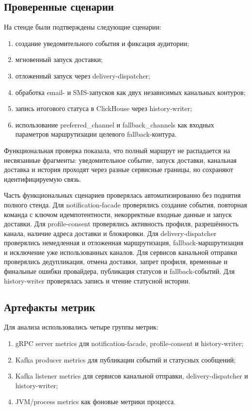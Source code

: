 \subsection{Проверенные сценарии}

На стенде были подтверждены следующие сценарии:
\begin{enumerate}
    \item создание уведомительного события и фиксация аудитории;
    \item мгновенный запуск доставки;
    \item отложенный запуск через delivery-dispatcher;
    \item обработка email- и SMS-запусков как двух независимых канальных контуров;
    \item запись итогового статуса в ClickHouse через history-writer;
    \item использование preferred\_channel и fallback\_channels как входных параметров маршрутизации целевого fallback-контура.
\end{enumerate}

Функциональная проверка показала, что полный маршрут не распадается на несвязанные фрагменты: уведомительное событие, запуск доставки, канальная доставка и история проходят через разные сервисные границы, но сохраняют идентифицируемую связь.

Часть функциональных сценариев проверялась автоматизированно без поднятия полного стенда. Для notification-facade проверялись создание события, повторная команда с ключом идемпотентности, некорректные входные данные и запуск доставки. Для profile-consent проверялись активность профиля, разрешённость канала, наличие адреса доставки и блокировки. Для delivery-dispatcher проверялись немедленная и отложенная маршрутизация, fallback-маршрутизация и исключение уже использованных каналов. Для сервисов канальной отправки проверялись дедупликация, отмена доставки, запрет профиля, временные и финальные ошибки провайдера, публикация статусов и fallback-событий. Для history-writer проверялась запись и чтение статусной истории.

\subsection{Артефакты метрик}

Для анализа использовались четыре группы метрик:
\begin{enumerate}
    \item gRPC server metrics для notification-facade, profile-consent и history-writer;
    \item Kafka producer metrics для публикации событий и статусных сообщений;
    \item Kafka listener metrics для сервисов канальной отправки, delivery-dispatcher и history-writer;
    \item JVM/process metrics как фоновые метрики процесса.
\end{enumerate}

